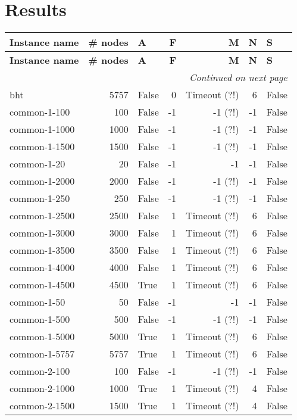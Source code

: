 \section{Results}
\begin{longtable}{lrlrrrl}\toprule \textbf{Instance name}& \textbf{\# nodes}& \textbf{A}& \textbf{F}& \textbf{M}& \textbf{N}& \textbf{S}\\
\midrule
\endfirsthead
\toprule
 \textbf{Instance name}& \textbf{\# nodes}& \textbf{A}& \textbf{F}& \textbf{M}& \textbf{N}& \textbf{S}\\
\midrule
\endhead
\midrule
\multicolumn{7}{r}{\textit{Continued on next page}} \\
\midrule
\endfoot
\bottomrule
\endlastfoot
bht & 5757 & False & 0 & Timeout (?!) & 6 & False \\
common-1-100 & 100 & False & -1 & -1 (?!) & -1 & False \\
common-1-1000 & 1000 & False & -1 & -1 (?!) & -1 & False \\
common-1-1500 & 1500 & False & -1 & -1 (?!) & -1 & False \\
common-1-20 & 20 & False & -1 & -1 & -1 & False \\
common-1-2000 & 2000 & False & -1 & -1 (?!) & -1 & False \\
common-1-250 & 250 & False & -1 & -1 (?!) & -1 & False \\
common-1-2500 & 2500 & False & 1 & Timeout (?!) & 6 & False \\
common-1-3000 & 3000 & False & 1 & Timeout (?!) & 6 & False \\
common-1-3500 & 3500 & False & 1 & Timeout (?!) & 6 & False \\
common-1-4000 & 4000 & False & 1 & Timeout (?!) & 6 & False \\
common-1-4500 & 4500 & True & 1 & Timeout (?!) & 6 & False \\
common-1-50 & 50 & False & -1 & -1 & -1 & False \\
common-1-500 & 500 & False & -1 & -1 (?!) & -1 & False \\
common-1-5000 & 5000 & True & 1 & Timeout (?!) & 6 & False \\
common-1-5757 & 5757 & True & 1 & Timeout (?!) & 6 & False \\
common-2-100 & 100 & False & -1 & -1 (?!) & -1 & False \\
common-2-1000 & 1000 & True & 1 & Timeout (?!) & 4 & False \\
common-2-1500 & 1500 & True & 1 & Timeout (?!) & 4 & False \\

\end{longtable}
